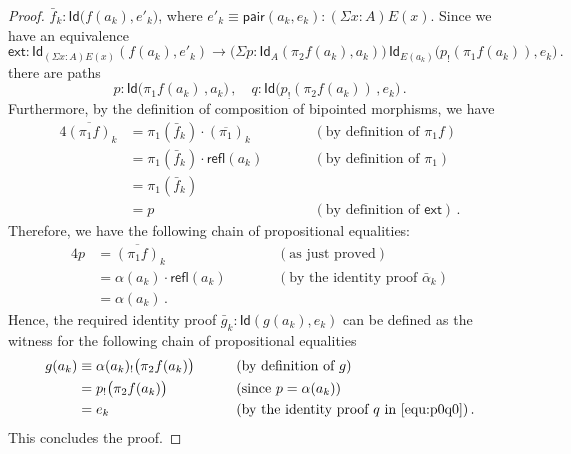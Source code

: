 \documentclass[10pt,a4paper,oneside,reqno]{amsart}
\numberwithin{equation}{section}
\theoremstyle{mythm}
\theoremstyle{mydef}
\theoremstyle{myrmk}
\newcommand{\deq}{\equiv}
\newcommand{\peq}{=}
\newcommand{\co}{\colon}
\newcommand{\ext}{\mathsf{ext}}
\newcommand{\ct}{\cdot}
\newcommand{\pair}{\mathsf{pair}}
\newcommand{\Id}{\mathsf{Id}}
\newcommand{\refl}{\mathsf{refl}}
\begin{document}
\begin{proof}
$\bar{f}_k \co \Id \big( f(a_k),  e'_k\big)$, where $e'_k \equiv \pair(a_k, e_k) \co (\Sigma x :A ) E(x)$. Since we have an equivalence
\[
\ext \co \Id_{(\Sigma x : A) E(x)}( f(a_k), e'_k) \to \big( \Sigma p \co \Id_A( \pi_2 f(a_k), a_k) \big) \, \Id_{E(a_k)} \big( p_{!}( \pi_1 f(a_k)) , e_k \big) \, .
\]
there are paths 
\begin{equation}
\label{equ:p0q0}
p \co \Id \big( \pi_1 f (a_k) \, , a_k \big) \, , \quad q \co \Id \big( p_{!}( \pi_2 f (a_k)) \, , e_k \big)  \, .
\end{equation}
Furthermore, by the definition of composition of bipointed morphisms, we have
\begin{alignat*}{4}  
\overline{(\pi_1 f)}_k  & = \pi_1(\bar{f}_k) \ct (\overline{\pi_1})_k & & \qquad (\text{by definition of } \pi_1 f)   \\
& = \pi_1(\bar{f}_k) \ct \refl(a_k) & & \qquad (\text{by definition of } \pi_1)  \\
 & = \pi_1(\bar{f}_k) & & \qquad \\
 & = p  & & \qquad (\text{by definition of } \ext) \,  .
\end{alignat*}
Therefore, we have the following chain of propositional equalities:
\begin{alignat*}{4}
p & =  \overline{(\pi_1 f)}_k & &  \qquad (\text{as just proved})  \\
  & =  \alpha(a_k) \ct \refl(a_k) & &  \qquad (\text{by the identity proof } \bar{\alpha}_k ) \\ 
  & =  \alpha(a_k) \, .
\end{alignat*} 
Hence,  the required identity proof $\bar{g}_k \co \Id( g(a_k), e_k)$ can be defined as the witness for the following chain of propositional equalities
\begin{alignat*}{4}
g(a_k) & \deq \alpha(a_k)_{!} \big( \pi_2 f(a_k)  \big) & & \qquad (\text{by definition of } g) \\
 &              \peq   p_{!} \big( \pi_2 f(a_k)  \big) & & \qquad (\text{since } p = \alpha(a_k)) \\
   &            \peq  e_k  & &  \qquad (\text{by the identity proof } q \text{ in } \eqref{equ:p0q0})  \, .
   \end{alignat*} 
   This concludes the proof.
\end{proof}
\end{document}
